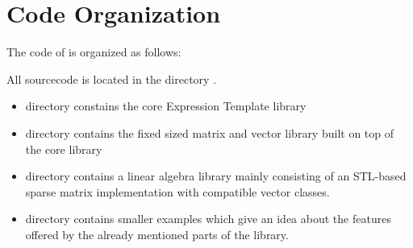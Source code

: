 
\section{Code Organization}
\label{sec: Code Organization}


The code of \Daixtrose is organized as follows:

All sourcecode is located in the directory . 

\begin{itemize}
\item directory  constains the core Expression Template library 
\item directory  contains the fixed sized matrix and vector
  library built on top of the \Daixtrose core library
\item directory  contains a linear algebra library mainly
  consisting of an STL-based sparse matrix implementation with
  compatible vector classes.
\item directory  contains smaller examples which give an idea
  about the features offered by the already mentioned parts of the library.
\end{itemize}



